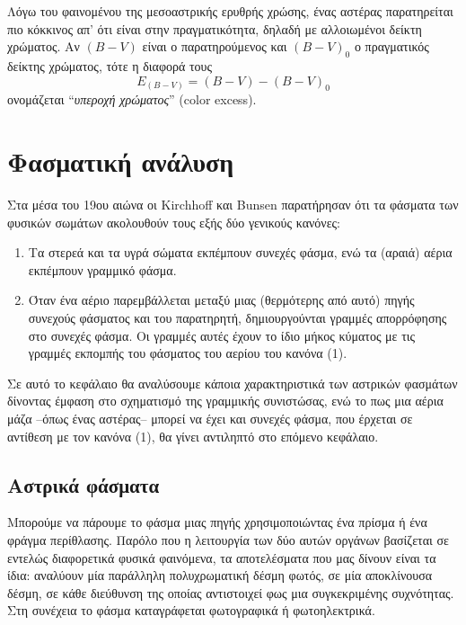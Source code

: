 Λόγω του φαινομένου της μεσοαστρικής ερυθρής χρώσης, ένας αστέρας παρατηρείται πιο κόκκινος απ' ότι είναι στην πραγματικότητα, δηλαδή με αλλοιωμένοι δείκτη χρώματος. Αν $(B-V)$ είναι ο παρατηρούμενος και $(B-V)_0$ ο πραγματικός δείκτης χρώματος, τότε η διαφορά τους
\begin{equation}
    E_{(B-V)} = (B-V) - (B-V)_0
\end{equation}
ονομάζεται ``\textit{υπεροχή χρώματος}'' (color excess).


\section{Φασματική ανάλυση}
Στα μέσα του 19ου αιώνα οι Kirchhoff και Bunsen παρατήρησαν ότι τα φάσματα των φυσικών σωμάτων ακολουθούν τους εξής δύο γενικούς κανόνες:
\begin{enumerate}
    \item Τα στερεά και τα υγρά σώματα εκπέμπουν συνεχές φάσμα, ενώ τα (αραιά) αέρια εκπέμπουν γραμμικό φάσμα.
    \item Όταν ένα αέριο παρεμβάλλεται μεταξύ μιας (θερμότερης από αυτό) πηγής συνεχούς φάσματος και του παρατηρητή, δημιουργούνται γραμμές απορρόφησης στο συνεχές φάσμα. Οι γραμμές αυτές έχουν το ίδιο μήκος κύματος με τις γραμμές εκπομπής του φάσματος του αερίου του κανόνα (1).
\end{enumerate}

Σε αυτό το κεφάλαιο θα αναλύσουμε κάποια χαρακτηριστικά των αστρικών φασμάτων δίνοντας έμφαση στο σχηματισμό της γραμμικής συνιστώσας, ενώ το πως μια αέρια μάζα --όπως ένας αστέρας-- μπορεί να έχει και συνεχές φάσμα, που έρχεται σε αντίθεση με τον κανόνα (1), θα γίνει αντιληπτό στο επόμενο κεφάλαιο.

\subsection{Αστρικά φάσματα}

Μπορούμε να πάρουμε το φάσμα μιας πηγής χρησιμοποιώντας ένα πρίσμα ή ένα φράγμα περίθλασης. Παρόλο που η λειτουργία των δύο αυτών οργάνων βασίζεται σε εντελώς διαφορετικά φυσικά φαινόμενα, τα αποτελέσματα που μας δίνουν είναι τα ίδια: αναλύουν μία παράλληλη πολυχρωματική δέσμη φωτός, σε μία αποκλίνουσα δέσμη, σε κάθε διεύθυνση της οποίας αντιστοιχεί φως μια συγκεκριμένης συχνότητας. Στη συνέχεια το φάσμα καταγράφεται φωτογραφικά ή φωτοηλεκτρικά.

